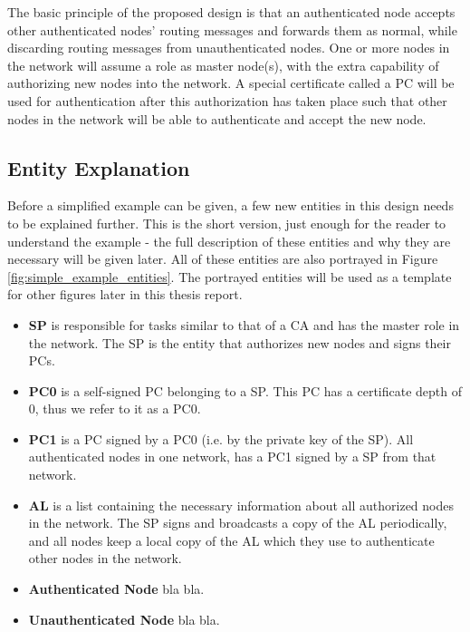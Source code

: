 The basic principle of the proposed design is that an authenticated node accepts
other authenticated nodes' routing messages and forwards them as normal, while
discarding routing messages from unauthenticated nodes. One or more nodes in the
network will assume a role as master node(s), with the extra capability of
authorizing new nodes into the network. A special certificate called a \ac{PC}
\cite{rfc3820} will be used for authentication after this authorization has taken
place such that other nodes in the network will be able to authenticate and
accept the new node.


\subsection{Entity Explanation}

Before a simplified example can be given, a few new entities in this design
needs to be explained further. This is the short version, just enough for the
reader to understand the example - the full description of these entities
and why they are necessary will be given later. All of these entities are also
portrayed in Figure \ref{fig:simple_example_entities}. The portrayed entities
will be used as a template for other figures later in this thesis report.

\begin{itemize}
  \item \textbf{\acf{SP}} is responsible for tasks similar to that of a \ac{CA}
  	and has the master role in the network. The \ac{SP} is the entity that
 	 authorizes new nodes and signs their \acp{PC}.
  \item \textbf{\acf{PC0}} is a self-signed \ac{PC} belonging to a
  	\ac{SP}. This \ac{PC} has a certificate depth of 0, thus we refer to it as a
  	\ac{PC0}.
  \item \textbf{\acf{PC1}} is a \ac{PC} signed by a \ac{PC0} (i.e. by the
  private key of the \ac{SP}). All authenticated nodes in one network, has a
  \ac{PC1} signed by a \ac{SP} from that network.
  \item \textbf{\acf{AL}} is a list containing the necessary information about
 	all authorized nodes in the network. The \ac{SP} signs and broadcasts a copy
 	of the \ac{AL} periodically, and all nodes keep a local copy of the \ac{AL}
  	which they use to authenticate other nodes in the network.
  \item \textbf{Authenticated Node} bla bla.
  \item \textbf{Unauthenticated Node} bla bla.
\end{itemize}

